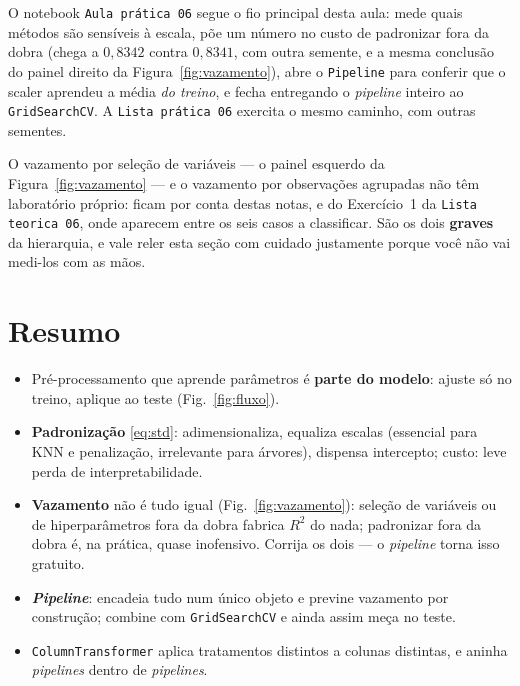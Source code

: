 \documentclass[11pt,a4paper]{article}
\begin{document}
O notebook \texttt{Aula prática 06} segue o fio principal desta aula: mede quais
métodos são sensíveis à escala, põe um número no custo de padronizar fora da dobra
(chega a $0{,}8342$ contra $0{,}8341$, com outra semente, e a mesma conclusão do
painel direito da Figura~\ref{fig:vazamento}), abre o \texttt{Pipeline} para
conferir que o scaler aprendeu a média \emph{do treino}, e fecha entregando o
\emph{pipeline} inteiro ao \texttt{GridSearchCV}. A \texttt{Lista prática 06}
exercita o mesmo caminho, com outras sementes.

O vazamento por seleção de variáveis --- o painel esquerdo da
Figura~\ref{fig:vazamento} --- e o vazamento por observações agrupadas não têm
laboratório próprio: ficam por conta destas notas, e do Exercício~1 da
\texttt{Lista teorica 06}, onde aparecem entre os seis casos a classificar. São os
dois \textbf{graves} da hierarquia, e vale reler esta seção com cuidado justamente
porque você não vai medi-los com as mãos.

\section*{Resumo}
\begin{itemize}[leftmargin=1.4cm]
  \item Pré-processamento que aprende parâmetros é \textbf{parte do modelo}: ajuste
        só no treino, aplique ao teste (Fig.~\ref{fig:fluxo}).
  \item \textbf{Padronização} \eqref{eq:std}: adimensionaliza, equaliza escalas
        (essencial para KNN e penalização, irrelevante para árvores), dispensa
        intercepto; custo: leve perda de interpretabilidade.
  \item \textbf{Vazamento} não é tudo igual (Fig.~\ref{fig:vazamento}): seleção de
        variáveis ou de hiperparâmetros fora da dobra fabrica $R^2$ do nada;
        padronizar fora da dobra é, na prática, quase inofensivo. Corrija os dois
        --- o \emph{pipeline} torna isso gratuito.
  \item \textbf{\emph{Pipeline}}: encadeia tudo num único objeto e previne
        vazamento por construção; combine com \texttt{GridSearchCV} e ainda assim
        meça no teste.
  \item \texttt{ColumnTransformer} aplica tratamentos distintos a colunas distintas,
        e aninha \emph{pipelines} dentro de \emph{pipelines}.
\end{itemize}
\end{document}
